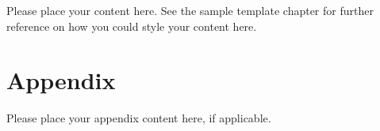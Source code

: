 \documentclass[
graybox,
envcountchap
]{svmult}
\begin{document}
\begin{bibunit}
	Please place your content here. See the sample template chapter for further reference on how you could style your content here.


	\section*{Appendix}\label{appendix}

	Please place your appendix content here, if applicable.




	\putbib[bibliography] %

\end{bibunit}

\end{document}
